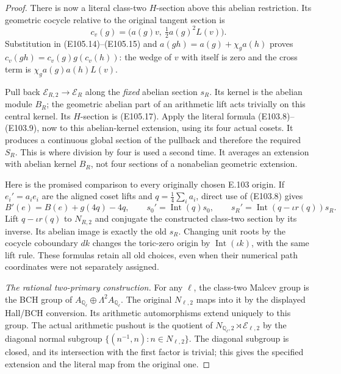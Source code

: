 \begin{proof}
There is now a literal class-two $H$-section above this
abelian restriction.  Its geometric cocycle relative to
the original tangent section is
\[
        c_v(g)=\bigl(a(g)v,\ \tfrac12a(g)^2L(v)\bigr).
 \tag{E105.17}
\]
Substitution in (E105.14)--(E105.15) and
$a(gh)=a(g)+\chi_ga(h)$ proves
$c_v(gh)=c_v(g)g(c_v(h))$: the wedge of $v$ with
itself is zero and the cross term is
$\chi_ga(g)a(h)L(v)$.

Pull back $\mathcal E_{R,2}\to\mathcal E_R$ along the
\emph{fixed} abelian section $s_R$.
Its kernel is the abelian module $B_R$; the geometric
abelian part of an arithmetic lift acts trivially on
this central kernel.  Its $H$-section is (E105.17).
Apply the literal formula (E103.8)--(E103.9), now to
this abelian-kernel extension, using its four actual
cosets.  It produces a continuous global section of
the pullback and therefore the required $S_R$.
This is where division by four is used a second time.
It averages an extension with abelian kernel $B_R$,
not four sections of a nonabelian geometric extension.

Here is the promised comparison to every originally
chosen E.103 origin.  If $e_i'=a_i e_i$ are the aligned
coset lifts and $q=\tfrac14\sum_i a_i$, direct use of
(E103.8) gives
\[
 B'(e)=B(e)+g(4q)-4q,\qquad
 s_0'=\operatorname{Int}(q)s_0,\qquad
 s_R'=\operatorname{Int}(q-\iota r(q))s_R.
 \tag{E105.18}
\]
Lift $q-\iota r(q)$ to $N_{R,2}$ and conjugate the
constructed class-two section by its inverse.
Its abelian image is exactly the old $s_R$.
Changing unit roots by the cocycle coboundary $dk$
changes the toric-zero origin by
$\operatorname{Int}(\iota k)$, with the same lift rule.
These formulas retain all old choices, even when their
numerical path coordinates were not separately assigned.

\emph{The rational two-primary construction.}
For any $\ell$, the class-two Malcev group is the BCH
group of $A_{\mathbb Q_\ell}\oplus\Lambda^2A_{\mathbb Q_\ell}$.
The original $N_{\ell,2}$ maps into it by the displayed
Hall/BCH conversion.  Its arithmetic automorphisms extend
uniquely to this group.  The actual arithmetic pushout is
the quotient of $N_{\mathbb Q_\ell,2}\rtimes\mathcal E_{\ell,2}$
by the diagonal normal subgroup
$\{(n^{-1},n):n\in N_{\ell,2}\}$.
The diagonal subgroup is closed, and its intersection
with the first factor is trivial; this gives the specified
extension and the literal map from the original one.


\end{proof}
